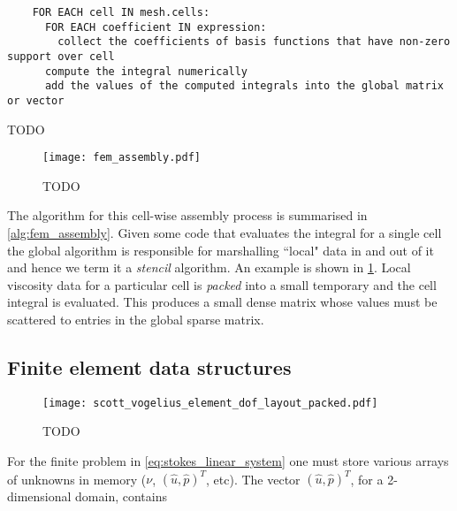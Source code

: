 \documentclass[thesis]{subfiles}
\begin{document}
%
%

\begin{algorithm}
  \begin{verbatim}
    FOR EACH cell IN mesh.cells:
      FOR EACH coefficient IN expression:
        collect the coefficients of basis functions that have non-zero support over cell
      compute the integral numerically
      add the values of the computed integrals into the global matrix or vector
  \end{verbatim}
  \caption{TODO}
  \label{alg:fem_assembly}
\end{algorithm}

\begin{figure}
  \centering
  \texttt{[image: fem\_assembly.pdf]}
  \caption{TODO}
  \label{fig:fem_assembly}
\end{figure}

The algorithm for this cell-wise assembly process is summarised in \cref{alg:fem_assembly}.
Given some code that evaluates the integral for a single cell the global algorithm is responsible for marshalling ``local" data in and out of it and hence we term it a \textit{stencil} algorithm.
An example is shown in \cref{fig:fem_assembly}.
Local viscosity data for a particular cell is \textit{packed} into a small temporary and the cell integral is evaluated.
This produces a small dense matrix whose values must be scattered to entries in the global sparse matrix.

\subsection{Finite element data structures}

\begin{figure}
  \centering
  \texttt{[image: scott\_vogelius\_element\_dof\_layout\_packed.pdf]}
  \caption{TODO}
  \label{fig:scott_vogelius_element_dof_layout_packed}
\end{figure}

For the finite problem in \cref{eq:stokes_linear_system} one must store various arrays of unknowns in memory ($\nu$, $(\hat u, \hat p)^T$, etc).
The vector $(\hat u, \hat p)^T$, for a 2-dimensional domain, contains
\end{document}
